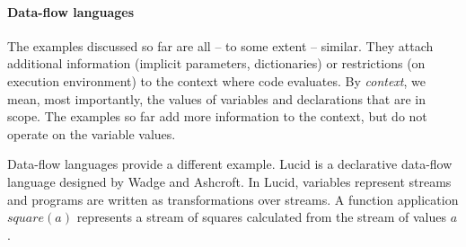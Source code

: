 \paragraph{Data-flow languages}

The examples discussed so far are all -- to some extent -- similar. They attach additional 
information (implicit parameters, dictionaries) or restrictions (on execution environment) to the
context where code evaluates. By \emph{context}, we mean, most importantly, the values of variables
and declarations that are in scope. The examples so far add more information to the context, but
do not operate on the variable values.

Data-flow languages provide a different example. Lucid \cite{app-lucid} is a declarative data-flow 
language designed by Wadge and Ashcroft. In Lucid, variables represent streams and programs
are written as transformations over streams. A function application $\mathit{square}(a)$ represents
a stream of squares calculated from the stream of values $a$.

